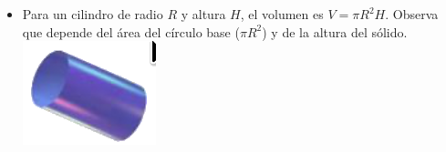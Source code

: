 \documentclass[12pt,a4paper]{article}
\begin{document}
\begin{tcolorbox}[enhanced, breakable,
	colback=fondoazul, colframe=azuloscuro, title=\textbf{RECUERDA QUE...}, breakable]
\begin{itemize}[nosep]
\begin{itemize}[nosep]
			\item %
			\begin{tcolorbox}[enhanced, frame hidden, boxrule=0pt, colback=fondoazul,
				sidebyside, sidebyside align=top seam, sidebyside gap=8pt,
				righthand width=0.15\textwidth]
				Para un cilindro de radio $R$ y altura $H$, el volumen es
				$V=\pi R^2H$. Observa que depende del área del círculo base ($\pi R^2$) y
				de la altura del sólido.
				\tcblower
				\includegraphics[width=\linewidth]{Figuras/fig3.png}
			\end{tcolorbox}
		\end{itemize}
		

\end{itemize}
\end{tcolorbox}
\end{document}
